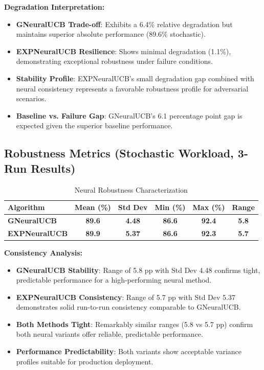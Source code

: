 \documentclass[12pt,a4paper]{article}
\newcommand{\success}[1]{\textcolor{accentgreen}{\textbf{#1}}}
\newcommand{\legacy}[1]{\textcolor{legacycolor}{\textbf{#1}}}
\newcommand{\neural}[1]{\textcolor{neuralcolor}{\textbf{#1}}}
\begin{document}
\textbf{Degradation Interpretation:}
\begin{itemize}
\item \neural{GNeuralUCB Trade-off}: Exhibits a 6.4\% relative degradation but maintains superior absolute performance (89.6\% stochastic).
\item \legacy{EXPNeuralUCB Resilience}: Shows minimal degradation (1.1\%), demonstrating exceptional robustness under failure conditions.
\item \success{Stability Profile}: EXPNeuralUCB's small degradation gap combined with neural consistency represents a favorable robustness profile for adversarial scenarios.
\item \neural{Baseline vs. Failure Gap}: GNeuralUCB's 6.1 percentage point gap is expected given the superior baseline performance.
\end{itemize}

\subsection{Robustness Metrics (Stochastic Workload, 3-Run Results)}

\begin{table}[H]
\centering
\caption{Neural Robustness Characterization}
\label{tab:robustness}
\begin{tabular}{@{}lccccc@{}}
\toprule
\textbf{Algorithm} & \textbf{Mean (\%)} & \textbf{Std Dev} & \textbf{Min (\%)} & \textbf{Max (\%)} & \textbf{Range} \\
\midrule
\neural{GNeuralUCB}        & \neural{89.6} & \neural{4.48} & \neural{86.6} & \neural{92.4} & \neural{5.8} \\
\legacy{EXPNeuralUCB}       & \legacy{89.9} & \legacy{5.37} & \legacy{86.6} & \legacy{92.3} & \legacy{5.7} \\
\bottomrule
\end{tabular}
\end{table}

\textbf{Consistency Analysis:}
\begin{itemize}
\item \neural{GNeuralUCB Stability}: Range of 5.8 pp with Std Dev 4.48 confirms tight, predictable performance for a high-performing neural method.
\item \legacy{EXPNeuralUCB Consistency}: Range of 5.7 pp with Std Dev 5.37 demonstrates solid run-to-run consistency comparable to GNeuralUCB.
\item \success{Both Methods Tight}: Remarkably similar ranges (5.8 vs 5.7 pp) confirm both neural variants offer reliable, predictable performance.
\item \neural{Performance Predictability}: Both variants show acceptable variance profiles suitable for production deployment.
\end{itemize}
\end{document}
